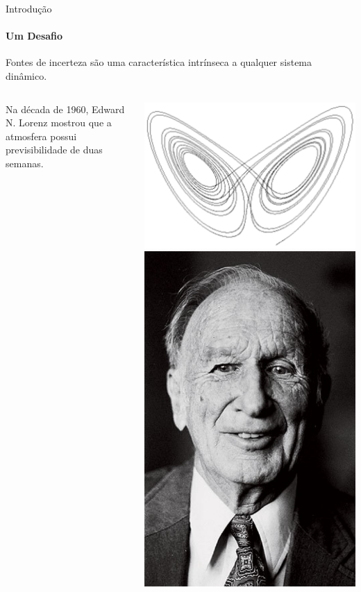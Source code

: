 \documentclass[10pt,aspectratio=169]{beamer}
\begin{document}
\begin{frame}[fragile]{Introdução}
\framesubtitle{Um Desafio}
  Fontes de incerteza são uma característica intrínseca a qualquer sistema dinâmico.\\
  \begin{columns}[onlytextwidth,T]
    \column{\dimexpr\linewidth-43mm-5mm}
      \parbox{\linewidth}
      {\vspace{0.4cm} 
        Na década de 1960, Edward N. Lorenz mostrou que a atmosfera possui previsibilidade de duas semanas.
      } \hfill
    \column{24mm}
      \includegraphics[scale=0.27]{figs/lorenz_attractor.pdf} \hfill
    \column{12mm}
      \includegraphics[scale=0.15]{figs/lorenz.pdf} 

\end{columns}
\end{frame}
\end{document}
